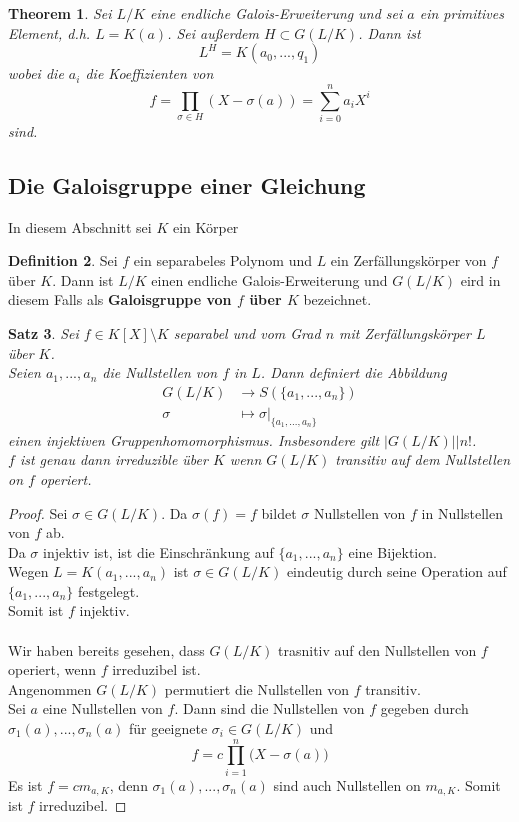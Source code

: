 \documentclass[10pt,a4paper]{article}
\newcommand{\abs}[1]{\left|#1\right|}
\theoremstyle{plain}
\newtheorem{theorem}{Theorem}[section]
\newtheorem{satz}[theorem]{Satz}
\theoremstyle{definition}
\newtheorem{definition}[theorem]{Definition}
\theoremstyle{remark}
\begin{document}
	\begin{theorem}
		Sei $L/K$ eine endliche Galois-Erweiterung und sei $a$ ein primitives Element, d.h. $L=K(a)$. Sei außerdem $H\subset G(L/K)$. Dann ist\[L^H=K(a_0,...,q_1)\]
		wobei die $a_i$ die Koeffizienten von
		\[f=\prod_{\sigma\in H}(X-\sigma(a))=\sum_{i=0}^{n}a_iX^i\]
		sind.
	\end{theorem}

	
	
	\subsection{Die Galoisgruppe einer Gleichung}
	In diesem Abschnitt sei $K$ ein Körper
	\begin{definition}
		Sei $f$ ein separabeles Polynom und $L$ ein Zerfällungskörper von $f$ über $K$. Dann ist $L/K$ einen endliche Galois-Erweiterung und $G(L/K)$ eird in diesem Falls als \textbf{Galoisgruppe von $f$ über $K$} bezeichnet.
	\end{definition}

	\begin{satz}
		Sei $f\in K[X]\setminus K$ separabel und vom Grad $n$ mit Zerfällungskörper $L$ über $K$.\\
		Seien $a_1,...,a_n$ die Nullstellen von $f$ in $L$. Dann definiert die Abbildung
		\begin{align*}
		G(L/K)&\to S(\{a_1,...,a_n\})\\
		\sigma&\mapsto\sigma|_{\{a_1,...,a_n\}}
		\end{align*}
		einen injektiven Gruppenhomomorphismus. Insbesondere gilt $\abs{G(L/K)}|n!$.\\
		$f$ ist genau dann irreduzible über $K$ wenn $G(L/K)$ transitiv auf dem Nullstellen on $f$ operiert.
	\end{satz}
	\begin{proof}
		Sei $\sigma\in G(L/K)$. Da $\sigma(f)=f$ bildet $\sigma$ Nullstellen von $f$ in Nullstellen von $f$ ab.\\
		Da $\sigma$ injektiv ist, ist die Einschränkung auf $\{a_1,...,a_n\}$ eine Bijektion.\\
		Wegen $L=K(a_1,...,a_n)$ ist $\sigma\in G(L/K)$ eindeutig durch seine Operation auf $\{a_1,...,a_n\}$ festgelegt.\\
		Somit ist $f$ injektiv.\\
		\\
		Wir haben bereits gesehen, dass $G(L/K)$ trasnitiv auf den Nullstellen von $f$ operiert, wenn $f$ irreduzibel ist.\\
		Angenommen $G(L/K)$ permutiert die Nullstellen von $f$ transitiv.\\
		Sei $a$ eine Nullstellen von $f$. Dann sind die Nullstellen von $f$ gegeben durch $\sigma_1(a),...,\sigma_n(a)$ für geeignete $\sigma_i\in G(L/K)$ und
		\[f=c\prod_{i=1}^{n}\big(X-\sigma(a)\big)\]
		Es ist $f=cm_{a,K}$, denn $\sigma_1(a),...,\sigma_n(a)$ sind auch Nullstellen on $m_{a,K}$. Somit ist $f$ irreduzibel.
	\end{proof}
\end{document}
